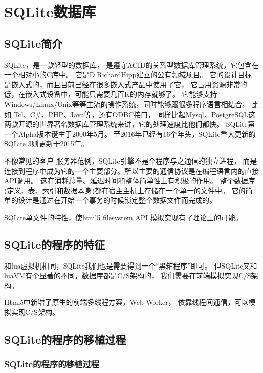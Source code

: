 \chapter{SQLite数据库}

\section{SQLite简介}

SQLite，是一款轻型的数据库，
是遵守ACID的关系型数据库管理系统，它包含在一个相对小的C库中。
它是D.RichardHipp建立的公有领域项目。
它的设计目标是嵌入式的，而且目前已经在很多嵌入式产品中使用了它，
它占用资源非常的低，在嵌入式设备中，可能只需要几百K的内存就够了。
它能够支持Windows/Linux/Unix等等主流的操作系统，同时能够跟很多程序语言相结合，
比如 Tcl、C\#、PHP、Java等，还有ODBC接口，
同样比起Mysql、PostgreSQL这两款开源的世界著名数据库管理系统来讲，它的处理速度比他们都快。
SQLite第一个Alpha版本诞生于2000年5月。 
至2016年已经有16个年头，SQLite重大更新的SQLite 3则更新于2015年。

不像常见的客户-服务器范例，SQLite引擎不是个程序与之通信的独立进程，
而是连接到程序中成为它的一个主要部分。所以主要的通信协议是在编程语言内的直接API调用。
这在消耗总量、延迟时间和整体简单性上有积极的作用。
整个数据库(定义、表、索引和数据本身)都在宿主主机上存储在一个单一的文件中。
它的简单的设计是通过在开始一个事务的时候锁定整个数据文件而完成的。

SQLite单文件的特性，使html5 filesystem API
模拟实现有了理论上的可能。

\section{SQLite的程序的特征}

和lua虚拟机相同，SQLite我们也是需要得到一个“黑箱程序”即可。
但SQLite又和luaVM有个显著的不同，数据库都是C/S架构的，
我们需要在前端模拟实现C/S架构。

Html5中新增了原生的前端多线程方案，Web Worker，
依靠线程间通信，可以模拟实现C/S架构。

\section{SQLite的程序的移植过程}

\subsection{SQLite的程序的移植过程}

